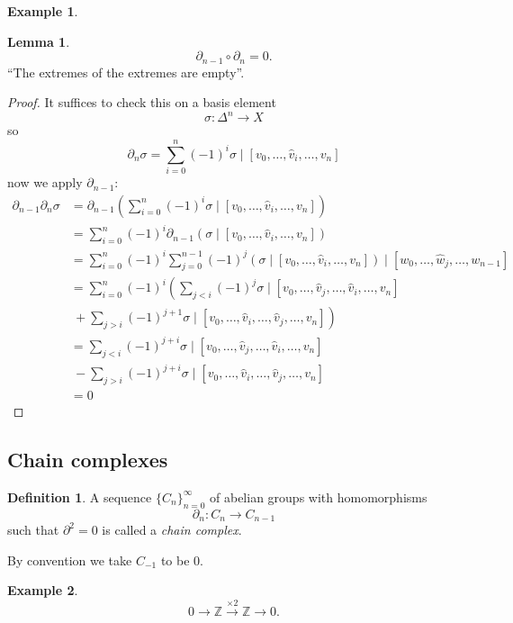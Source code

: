 \documentclass[12pt]{article}
\theoremstyle{definition}
\newtheorem*{lem}{Lemma}
\theoremstyle{definition}
\newtheorem*{defn}{Definition}
\newtheorem*{ex}{Example}
\newcommand{\ZZ}{\mathbb{Z}}
\begin{document}
\begin{ex}
\end{ex}

\begin{lem}
\[\partial_{n-1} \circ \partial_n = 0.\]
``The extremes of the extremes are empty''.
\end{lem}
\begin{proof}
It suffices to check this on a basis element
\[\sigma \colon \Delta^n \to X\]
so
\[\partial_n \sigma = \sum_{i=0}^{n} (-1)^i \sigma \mid[v_0, \ldots, \hat{v}_i,\ldots,v_n]\]
now we apply $\partial_{n-1}$:
\begin{align*}
\partial_{n-1} \partial_n \sigma &= \partial_{n-1} \left(\sum_{i=0}^{n} (-1)^i \sigma \mid[v_0, \ldots, \hat{v}_i,\ldots,v_n] \right) \\
&= \sum_{i=0}^{n} (-1)^i \partial_{n-1} \left(\sigma \mid[v_0, \ldots, \hat{v}_i,\ldots,v_n]\right)\\
&= \sum_{i=0}^{n} (-1)^i \sum_{j= 0}^{n-1} (-1)^j\left(\sigma \mid[v_0, \ldots, \hat{v}_i,\ldots,v_n]\right)\mid[w_0, \ldots, \hat{w}_j,\ldots,w_{n-1}]\\
&= \sum_{i=0}^{n} (-1)^i\left( \sum_{j< i} (-1)^j \sigma \mid[v_0, \ldots,\hat{v}_j, \ldots, \hat{v}_i,\ldots,v_n] \right.\\
&\ +\left. \sum_{j> i} (-1)^{j+1} \sigma \mid[v_0, \ldots, \hat{v}_i,\ldots,\hat{v}_j,\ldots,v_n]\right) \\
&= \sum_{j< i} (-1)^{j+i} \sigma \mid[v_0, \ldots,\hat{v}_j, \ldots, \hat{v}_i,\ldots,v_n] \\
&\ - \sum_{j> i} (-1)^{j+i} \sigma \mid[v_0, \ldots, \hat{v}_i,\ldots,\hat{v}_j,\ldots,v_n] \\
&= 0
\end{align*}
\end{proof}

\subsection{Chain complexes}
\begin{defn}
A sequence $\{C_n\}_{n=0}^{\infty}$ of abelian groups with homomorphisms
\[
\partial_n\colon C_n\to C_{n-1}
\]
such that $\partial^2 = 0$ is called a \emph{chain complex}.
\end{defn}

By convention we take $C_{-1}$ to be 0.

\begin{ex}
\[0\to\ZZ\xrightarrow{\times 2} \ZZ \to 0.\]
\end{ex}
\end{document}
